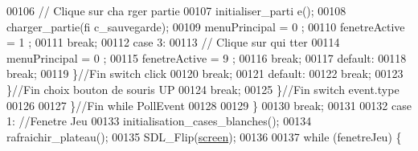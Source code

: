 \begin{DoxyCode}
00106                                                                 \textcolor{comment}{// Clique sur cha
      rger partie}
00107                                                                 initialiser\_parti
      e();
00108                                                                 charger\_partie(fi
      c\_sauvegarde);
00109                                                                 menuPrincipal = 0
      ;
00110                                                                 fenetreActive = 1
      ;
00111                                                                 \textcolor{keywordflow}{break};
00112                                                         \textcolor{keywordflow}{case} 3:
00113                                                                 \textcolor{comment}{// Clique sur qui
      tter}
00114                                                                 menuPrincipal = 0
      ;
00115                                                                 fenetreActive = 9
      ;
00116                                                                 \textcolor{keywordflow}{break};
00117                                                         \textcolor{keywordflow}{default}:
00118                                                                 \textcolor{keywordflow}{break};
00119                                                         \}\textcolor{comment}{//Fin switch click}
00120                                                         \textcolor{keywordflow}{break};
00121                                                 \textcolor{keywordflow}{default}:
00122                                                         \textcolor{keywordflow}{break};
00123                                                 \}\textcolor{comment}{//Fin choix bouton de souris UP}
00124                                                 \textcolor{keywordflow}{break};
00125                                         \}\textcolor{comment}{//Fin switch event.type}
00126 
00127                                 \}\textcolor{comment}{//Fin while PollEvent}
00128 
00129                         \}
00130                         \textcolor{keywordflow}{break};
00131 
00132                 \textcolor{keywordflow}{case} 1: \textcolor{comment}{//Fenetre Jeu}
00133                         initialisation\_cases\_blanches();
00134                         rafraichir\_plateau();
00135                         SDL\_Flip(\hyperlink{fonction_interface_8h_a78fa3957d73de49cb81d047857504218}{screen});
00136 
00137                         \textcolor{keywordflow}{while} (fenetreJeu) \{

\end{DoxyCode}
